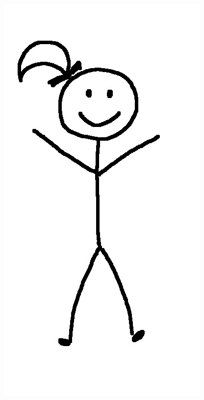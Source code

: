 \documentclass{beamer}\usepackage[]{graphicx}\usepackage[]{color}
\begin{document}


\begin{frame}
\begin{columns}
  \includegraphics[width=\textwidth]{me}
  

\end{columns}
\end{frame}
\end{document}
